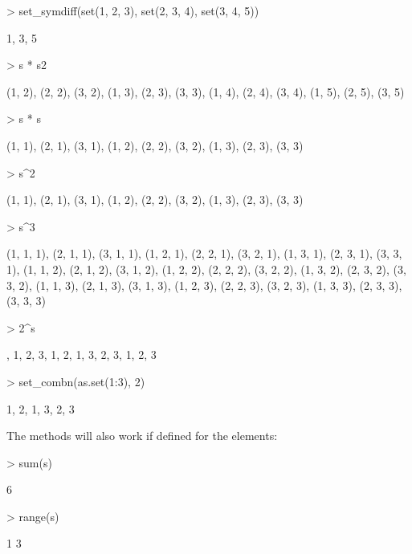 \documentclass[fleqn]{article}
\newcommand{\codefun}[1]{\code{#1()}}
\begin{document}
\begin{Schunk}
\begin{Sinput}
> set_symdiff(set(1, 2, 3), set(2, 3, 4), set(3, 4, 5))
\end{Sinput}
\begin{Soutput}
{1, 3, 5}
\end{Soutput}
\begin{Sinput}
> s * s2
\end{Sinput}
\begin{Soutput}
{(1, 2), (2, 2), (3, 2), (1, 3), (2, 3), (3, 3), (1, 4), (2, 4), (3,
 4), (1, 5), (2, 5), (3, 5)}
\end{Soutput}
\begin{Sinput}
> s * s
\end{Sinput}
\begin{Soutput}
{(1, 1), (2, 1), (3, 1), (1, 2), (2, 2), (3, 2), (1, 3), (2, 3), (3,
 3)}
\end{Soutput}
\begin{Sinput}
> s^2
\end{Sinput}
\begin{Soutput}
{(1, 1), (2, 1), (3, 1), (1, 2), (2, 2), (3, 2), (1, 3), (2, 3), (3,
 3)}
\end{Soutput}
\begin{Sinput}
> s^3
\end{Sinput}
\begin{Soutput}
{(1, 1, 1), (2, 1, 1), (3, 1, 1), (1, 2, 1), (2, 2, 1), (3, 2, 1), (1,
 3, 1), (2, 3, 1), (3, 3, 1), (1, 1, 2), (2, 1, 2), (3, 1, 2), (1, 2,
 2), (2, 2, 2), (3, 2, 2), (1, 3, 2), (2, 3, 2), (3, 3, 2), (1, 1, 3),
 (2, 1, 3), (3, 1, 3), (1, 2, 3), (2, 2, 3), (3, 2, 3), (1, 3, 3), (2,
 3, 3), (3, 3, 3)}
\end{Soutput}
\begin{Sinput}
> 2^s
\end{Sinput}
\begin{Soutput}
{{}, {1}, {2}, {3}, {1, 2}, {1, 3}, {2, 3}, {1, 2, 3}}
\end{Soutput}
\begin{Sinput}
> set_combn(as.set(1:3), 2)
\end{Sinput}
\begin{Soutput}
{{1, 2}, {1, 3}, {2, 3}}
\end{Soutput}
\end{Schunk}
The \codefun{Summary} methods will also work if defined for the
elements:
\begin{Schunk}
\begin{Sinput}
> sum(s)
\end{Sinput}
\begin{Soutput}
[1] 6
\end{Soutput}
\begin{Sinput}
> range(s)
\end{Sinput}
\begin{Soutput}
[1] 1 3
\end{Soutput}
\end{Schunk}
\end{document}
